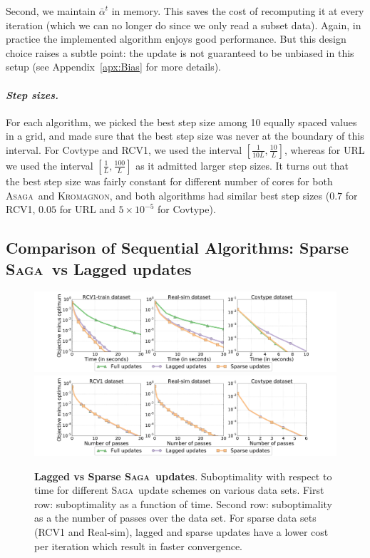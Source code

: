 \documentclass[twoside, 11pt]{article}
\newcommand{\ASAGA}{\textsc{Asaga}}
\newcommand{\SAGA}{\textsc{Saga}}
\newcommand{\KROMAGNON}{\textsc{Kromagnon}}
\begin{document}
Second, we maintain $\bar \alpha^t$ in memory.
This saves the cost of recomputing it at every iteration (which we can no longer do since we only read a subset data).
Again, in practice the implemented algorithm enjoys good performance.
But this design choice raises a subtle point: the update is not guaranteed to be unbiased in this setup (see Appendix~\ref{apx:Bias} for more details).

\paragraph{\textit{Step sizes.}}
For each algorithm, we picked the best step size among 10 equally spaced values in a grid, and made sure that the best step size was never at the boundary of this interval.
For Covtype and RCV1, we used the interval $[\frac{1}{10L}, \frac{10}{L}]$, whereas for URL we used  the interval $[\frac{1}{L}, \frac{100}{L}]$ as it admitted larger step sizes.
It turns out that the best step size was fairly constant for different number of cores for both \ASAGA\ and \KROMAGNON, and both algorithms had similar best step sizes ($0.7$ for RCV1, $0.05$ for URL and $5 \times 10^{-5}$ for Covtype).

\subsection{Comparison of Sequential Algorithms: Sparse \SAGA\ vs Lagged updates}\label{sec:ssagacomp}

\begin{figure}
	\includegraphics[width=\linewidth]{figures/fig1_all.pdf}
	\includegraphics[width=\linewidth]{figures/fig1_all_passes.pdf}
	\caption{{\bf Lagged vs Sparse \SAGA\ updates}.
		Suboptimality with respect to time for different \SAGA\ update schemes on various data sets. First row: suboptimality as a function of time. Second row: suboptimality as a the number of passes over the data set.
		For sparse data sets (RCV1 and Real-sim), lagged and sparse updates have a lower cost per iteration which result in faster convergence.}\label{fig:fig_1}
\end{figure}
\end{document}
